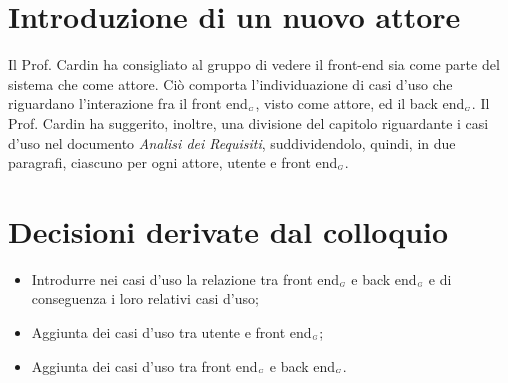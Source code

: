 \section{Introduzione di un nuovo attore}
Il Prof. Cardin ha consigliato al gruppo di vedere il front-end sia come parte del sistema che come attore. Ciò comporta l'individuazione di casi d'uso che riguardano l'interazione fra il front end$_{\scaleto{G}{3pt}}$, visto come attore, ed il back end$_{\scaleto{G}{3pt}}$. Il Prof. Cardin ha suggerito, inoltre, una divisione del capitolo riguardante i casi d'uso nel documento \textit{Analisi dei Requisiti}, suddividendolo, quindi, in due paragrafi, ciascuno per ogni attore, utente e front end$_{\scaleto{G}{3pt}}$. 
\section{Decisioni derivate dal colloquio}
\begin{itemize}
	\item Introdurre nei casi d'uso la relazione tra front end$_{\scaleto{G}{3pt}}$ e back end$_{\scaleto{G}{3pt}}$ e di conseguenza i loro relativi casi d'uso;
	\item Aggiunta dei casi d'uso tra utente e front end$_{\scaleto{G}{3pt}}$;
	\item Aggiunta dei casi d'uso tra front end$_{\scaleto{G}{3pt}}$ e back end$_{\scaleto{G}{3pt}}$.
\end{itemize}